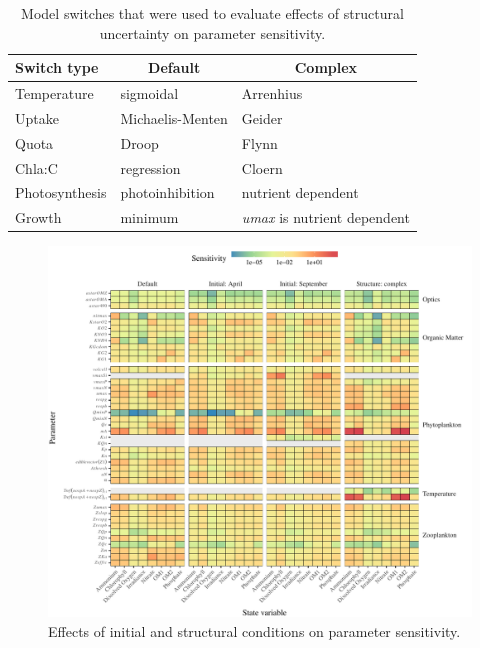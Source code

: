 \documentclass[letterpaper,12pt,oneside]{article}\usepackage[]{graphicx}\usepackage[]{color}
\begin{document}
\begin{table}[!tbp]
\caption{Model switches that were used to evaluate effects of structural uncertainty on parameter sensitivity.\label{tab:strcs}} 
\begin{center}
\begin{tabular}{lll}
\hline\hline
\multicolumn{1}{l}{Switch type}&\multicolumn{1}{c}{Default}&\multicolumn{1}{c}{Complex}\tabularnewline
\hline
Temperature&sigmoidal&Arrenhius\tabularnewline
Uptake&Michaelis-Menten&Geider\tabularnewline
Quota&Droop&Flynn\tabularnewline
Chla:C&regression&Cloern\tabularnewline
Photosynthesis&photoinhibition&nutrient dependent\tabularnewline
Growth&minimum&\textit{umax} is nutrient dependent\tabularnewline
\hline
\end{tabular}\end{center}

\end{table}

\clearpage


\begin{figure}[!ht]

{\centering \includegraphics[width=\textwidth]{figs/inistreval-1} 

}

\caption[Effects of initial and structural conditions on parameter sensitivity]{Effects of initial and structural conditions on parameter sensitivity.}\label{fig:inistreval}
\end{figure}
\end{document}
